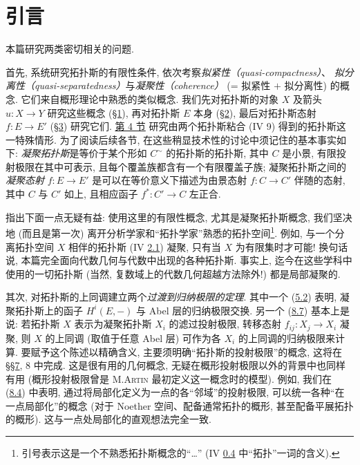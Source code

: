 \setcounter{pageoriginal}{164}

\setcounter{section}{-1}
\section{引言}

本篇\pageoriginale{}研究两类密切相关的问题.

首先, 系统研究拓扑斯的有限性条件,
依次考察\emph{拟紧性（quasi-compactness）}、
\emph{拟分离性（quasi-separatedness）}与\emph{凝聚性（coherence）}
(= 拟紧性 $+$ 拟分离性) 的概念.
它们来自概形理论中熟悉的类似概念.
我们先对拓扑斯的对象 $X$ 及箭头 $u : X \to Y$
研究这些概念 (\hyperref[VI.sec1]{\S 1}),
再对拓扑斯 $E$ 本身 (\hyperref[VI.sec2]{\S 2}),
最后对拓扑斯态射 $f : E \to E'$ (\hyperref[VI.sec3]{\S 3}) 研究它们.
\hyperref[VI.sec4]{第 4 节} 研究由两个拓扑斯粘合 (IV 9) 得到的拓扑斯这一特殊情形.
为了阅读后续各节, 在这些稍显技术性的讨论中须记住的基本事实如下:
\emph{凝聚拓扑斯}是等价于某个形如 $C^{\sim}$ 的拓扑斯的拓扑斯,
其中 $C$ 是小景, 有限投射极限在其中可表示,
且每个覆盖族都含有一个有限覆盖子族;
凝聚拓扑斯之间的\emph{凝聚态射} $f : E \to E'$
是可以在等价意义下描述为由景态射 $f : C \to C'$ 伴随的态射,
其中 $C$ 与 $C'$ 如上, 且相应函子 $f^{\ast} : C'\to C$ 左正合.

指出下面一点无疑有益:
使用这里的有限性概念, 尤其是凝聚拓扑斯概念,
我们坚决地 (而且是第一次) 离开分析学家和“拓扑学家”熟悉的拓扑空间\footnote{引号表示这是一个不熟悉拓扑斯概念的“\ldots”
(\cf IV \hyperref[IV.subsec0.4]{0.4} 中“拓扑”一词的含义).}.
例如, 与一个分离拓扑空间 $X$ 相伴的拓扑斯
(IV \hyperref[IV.subsec2.1]{2.1}) 凝聚, 只有当 $X$ 为有限集时才可能!
换句话说, 本篇完全面向代数几何与代数中出现的各种拓扑斯.
事实上, 迄今在这些学科中使用的一切拓扑斯
(当然, 复数域上的代数几何超越方法除外!) 都是局部凝聚的.

其次, 对拓扑斯的上同调建立两个\emph{过渡到归纳极限的定理}.
其中一个 (\hyperref[VI.cor5.2]{5.2}) 表明,
凝聚拓扑斯上的函子 $H^{i}(E, -)$\pageoriginale{}
与 Abel 层的归纳极限交换.
另一个 (\hyperref[VI.subsec8.7]{8.7}) 基本上是说:
若拓扑斯 $X$ 表示为凝聚拓扑斯 $X_i$ 的滤过投射极限,
转移态射 $f_{ij} : X_j \to X_i$ 凝聚,
则 $X$ 的上同调 (取值于任意 Abel 层)
可作为各 $X_i$ 的上同调的归纳极限来计算.
要赋予这个陈述以精确含义,
主要须明确“拓扑斯的投射极限”的概念,
这将在 \S\hyperref[VI.sec7]{\S 7}, 8 中完成.
这是很有用的几何概念,
无疑在概形投射极限以外的背景中也同样有用
(概形投射极限曾是 M.\textsc{Artin} 最初定义这一概念时的模型).
例如, 我们在 (\hyperref[VI.subsec8.4]{8.4}) 中表明,
通过将局部化定义为一点的各“邻域”的投射极限,
可以统一各种“在一点局部化”的概念
(对于 Noether 空间、配备通常拓扑的概形, 甚至配备平展拓扑的概形).
这与一点处局部化的直观想法完全一致.

